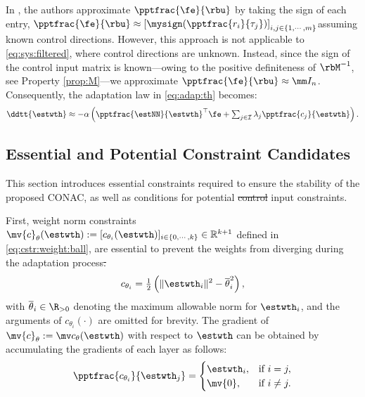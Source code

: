 \documentclass[letterpaper, journal]{IEEEtran}
\providecommand{\DIFadd}[1]{{\protect\color{blue}\uwave{#1}}} %
\providecommand{\DIFdel}[1]{{\protect\color{red}\sout{#1}}} %
\providecommand{\DIFaddbegin}{} %
\providecommand{\DIFaddend}{} %
\providecommand{\DIFdelbegin}{} %
\providecommand{\DIFdelend}{} %
\begin{document}
In \cite{Douratsos:2007aa,Saerens:1991aa}, the authors approximate $\pptfrac{\fe}{\rbu}$ by taking the sign of each entry, \ie
$
    \pptfrac{\fe}{\rbu}
    \approx
    \left[
        \mysign(\pptfrac{r_i}{\tau_j})
    \right]_{i,j\in\{1,\cdots,m\}}
$\DIFaddbegin \DIFadd{, 
}\DIFaddend assuming known control directions.
However, this approach is not applicable to \eqref{eq:sys:filtered}, where control directions are unknown.
Instead, since the sign of the control input matrix is known—owing to the positive definiteness of $\rbM^{-1}$, see Property \ref{prop:M}—we approximate $\pptfrac{\fe}{\rbu}\approx \mm I_n$.
Consequently, the adaptation law in \eqref{eq:adap:th} becomes:
\begin{equation}
    \ddtt{\estwth}
    \approx
    -\alpha 
    \left(
        \pptfrac{\estNN}
        {\estwth}^\top
        \fe
        +
        \textstyle\sum_{j\in\mathcal{I}}
        \lambda_j 
        \pptfrac{c_j}{\estwth}
    \right)
    .
    \label{eq:adap:th:approx}
\end{equation}

\subsection{Essential and Potential Constraint Candidates}\label{sec:sub:cstr} 

This section introduces essential constraints required to ensure the stability of the proposed CONAC, as well as conditions for potential \DIFdelbegin \DIFdel{control }\DIFdelend input constraints.

First, weight norm constraints \DIFdelbegin \DIFdel{$\mv{c}_{\theta}(\estwth):= [c_{\theta_i}(\estwth)]_{i\in\{0,\cdots ,k\}}\in\mathbb R^{k+1}$ }\DIFdelend \DIFaddbegin \DIFadd{$c_{\theta_i}(\estwth),\ \forall i\in\{0,\cdots ,k\}$, }\DIFaddend defined in \eqref{eq:cstr:weight:ball}, are essential to prevent the weights from diverging during the adaptation process\DIFdelbegin \DIFdel{.
}\DIFdelend \DIFaddbegin \DIFadd{:
}\DIFaddend \begin{equation}
    c_{\theta_i}
    =
    \tfrac{1}{2}
    \left(
        \Vert \estwth_i\Vert^2 
        -
        \overline\theta_i^2 
    \right)    
    ,
    \label{eq:cstr:weight:ball}
\end{equation}
with $\overline\theta_i\in\R_{>0}$ denoting the maximum allowable norm for $\estwth_i$, and the arguments of $c_{\theta_i}(\cdot)$ are omitted for brevity.
The gradient of \DIFdelbegin \DIFdel{$\mv{c}_\theta:=\mv c_{\theta}(\estwth)$ }\DIFdelend \DIFaddbegin \DIFadd{$c_{\theta_i}$ }\DIFaddend with respect to $\estwth$ can be obtained by accumulating the gradients of each layer as follows:
\begin{equation}
    \pptfrac{c_{\theta_i}}{\estwth_j} 
    =
    \begin{cases}
        \estwth_i,
        &
        \text{if } i=j,
        \\
        \mv{0},
        &
        \text{if } i\ne j
        .
    \end{cases} 
    \label{eq:cstr:weight:ball:grad}
\end{equation}
\end{document}
